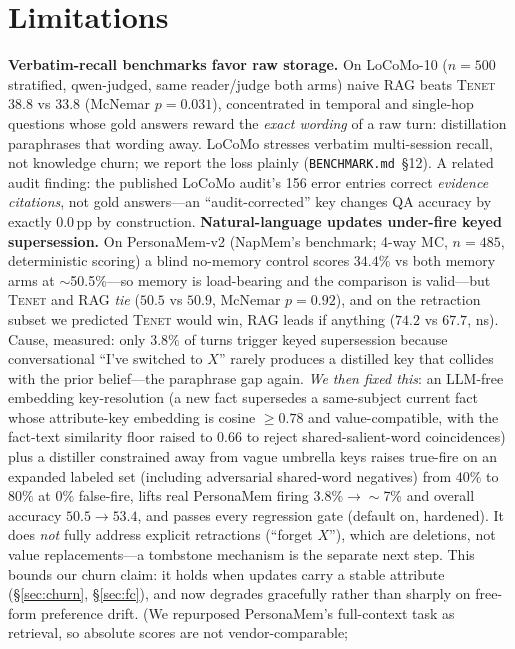 \documentclass[11pt]{article}
\newcommand{\tenet}{\textsc{Tenet}}
\begin{document}
\section{Limitations}\label{sec:limits}
\textbf{Verbatim-recall benchmarks favor raw storage.} On LoCoMo-10 ($n{=}500$
stratified, qwen-judged, same reader/judge both arms) naive RAG beats \tenet{}
$38.8$ vs $33.8$ (McNemar $p{=}0.031$), concentrated in temporal and single-hop
questions whose gold answers reward the \emph{exact wording} of a raw turn:
distillation paraphrases that wording away. LoCoMo stresses verbatim multi-session
recall, not knowledge churn; we report the loss plainly (\texttt{BENCHMARK.md}~\S12).
A related audit finding: the published LoCoMo audit's 156 error entries correct
\emph{evidence citations}, not gold answers---an ``audit-corrected'' key changes QA
accuracy by exactly $0.0$\,pp by construction.
\textbf{Natural-language updates under-fire keyed supersession.} On PersonaMem-v2
(NapMem's benchmark; 4-way MC, $n{=}485$, deterministic scoring) a blind no-memory
control scores $34.4\%$ vs both memory arms at $\sim$50.5\%---so memory is load-bearing
and the comparison is valid---but \tenet{} and RAG \emph{tie} ($50.5$ vs $50.9$,
McNemar $p{=}0.92$), and on the retraction subset we predicted \tenet{} would win, RAG
leads if anything ($74.2$ vs $67.7$, ns). Cause, measured: only $3.8\%$ of turns trigger
keyed supersession because conversational ``I've switched to $X$'' rarely produces a
distilled key that collides with the prior belief---the paraphrase gap again. \emph{We
then fixed this}: an LLM-free embedding key-resolution (a new fact supersedes a
same-subject current fact whose attribute-key embedding is cosine $\ge 0.78$ and
value-compatible, with the fact-text similarity floor raised to $0.66$ to reject
shared-salient-word coincidences) plus a distiller constrained away from vague umbrella
keys raises true-fire on an expanded labeled set (including adversarial shared-word
negatives) from $40\%$ to $80\%$ at $0\%$ false-fire, lifts real PersonaMem firing
$3.8\%\!\to\!\sim$7\% and overall accuracy $50.5\!\to\!53.4$, and passes every regression
gate (default on, hardened). It does \emph{not} fully address explicit retractions
(``forget $X$''), which are deletions, not value replacements---a tombstone mechanism is
the separate next step. This bounds our churn claim: it holds when updates carry a stable
attribute (\S\ref{sec:churn}, \S\ref{sec:fc}), and now degrades gracefully rather than
sharply on free-form preference drift. (We repurposed PersonaMem's
full-context task as retrieval, so absolute scores are not vendor-comparable;
\end{document}
